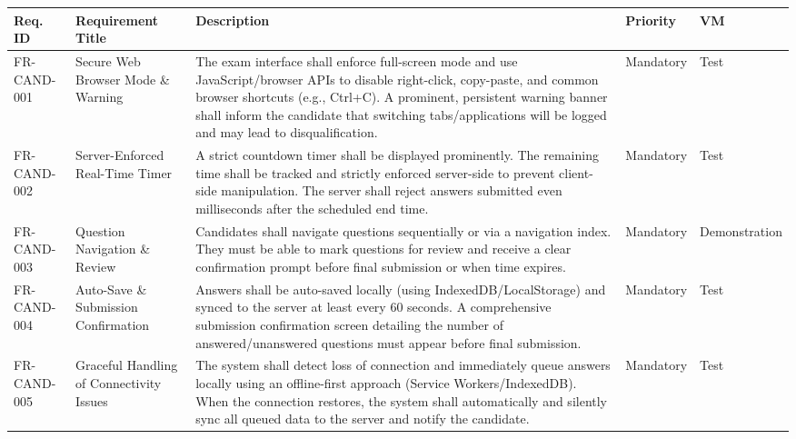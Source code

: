 \vspace{3em}

\begin{tabularx}{\linewidth}{|l|>{\raggedright\arraybackslash}p{4.5cm}|>{\raggedright\arraybackslash}X|l|l|}
\caption{Candidate Examination Interface Requirements}
\label{tab:candidate-exam-ui} \\ \hline
\textbf{Req. ID} & \textbf{Requirement Title} & \textbf{Description} & \textbf{Priority} & \textbf{VM} \\ \hline
FR-CAND-001 & Secure Web Browser Mode \& Warning & The exam interface shall enforce full-screen mode and use JavaScript/browser APIs to disable right-click, copy-paste, and common browser shortcuts (e.g., Ctrl+C). A prominent, persistent warning banner shall inform the candidate that switching tabs/applications will be logged and may lead to disqualification. & Mandatory & Test \\ \hline
FR-CAND-002 & Server-Enforced Real-Time Timer & A strict countdown timer shall be displayed prominently. The remaining time shall be tracked and strictly enforced server-side to prevent client-side manipulation. The server shall reject answers submitted even milliseconds after the scheduled end time. & Mandatory & Test \\ \hline
FR-CAND-003 & Question Navigation \& Review & Candidates shall navigate questions sequentially or via a navigation index. They must be able to mark questions for review and receive a clear confirmation prompt before final submission or when time expires. & Mandatory & Demonstration \\ \hline
FR-CAND-004 & Auto-Save \& Submission Confirmation & Answers shall be auto-saved locally (using IndexedDB/LocalStorage) and synced to the server at least every 60 seconds. A comprehensive submission confirmation screen detailing the number of answered/unanswered questions must appear before final submission. & Mandatory & Test \\ \hline
FR-CAND-005 & Graceful Handling of Connectivity Issues & The system shall detect loss of connection and immediately queue answers locally using an offline-first approach (Service Workers/IndexedDB). When the connection restores, the system shall automatically and silently sync all queued data to the server and notify the candidate. & Mandatory & Test \\ \hline

\end{tabularx}
